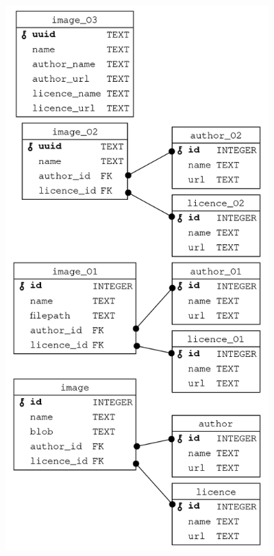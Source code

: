 \begin{figure}
  \centering
  \includegraphics[height=21cm]{images/image_database_schemas.png}
\end{figure}

